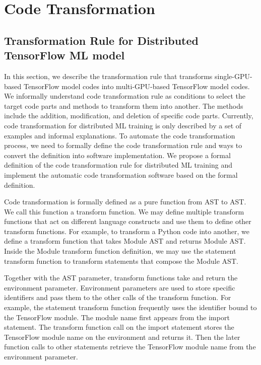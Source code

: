 \section{Code Transformation}\label{sec:trans}
\subsection{Transformation Rule for Distributed TensorFlow ML model}

In this section, we describe the transformation rule that
transforms single-GPU-based TensorFlow model codes into
multi-GPU-based TensorFlow model codes.
We informally understand code transformation rule as
conditions to select the target code parts
and methods to transform them into another.
The methods include the addition, modification, and deletion of
specific code parts.
Currently, code transformation for distributed ML training
is only described by a set of examples and informal explanations.
To automate the code transformation process,
we need to formally define the code transformation rule
and ways to convert the definition into software implementation.
We propose a formal definition of the code transformation rule
for distributed ML training and implement the automatic code transformation
software based on the formal definition.

Code transformation is formally defined as a pure function from AST to AST.
We call this function a transform function.
We may define multiple transform functions that act on different
language constructs and use them to define other transform functions.
For example, to transform a Python code into another,
we define a transform function that takes Module AST and returns Module AST.
Inside the Module transform function definition,
we may use the statement transform function to transform statements
that compose the Module AST.

Together with the AST parameter, transform functions take and return
the environment parameter.
Environment parameters are used to store specific identifiers
and pass them to the other calls of the transform function.
For example, the statement transform function frequently uses 
the identifier bound to the TensorFlow module.
The module name first appears from the import statement.
The transform function call on the import statement stores
the TensorFlow module name on the environment and returns it.
Then the later function calls to other statements
retrieve the TensorFlow module name from the environment parameter.


